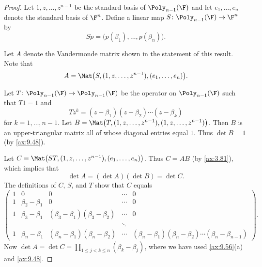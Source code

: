 \begin{proof}
Let $1,z,\dots,z^{n-1}$ be the standard basis of $\Poly_{n-1}(\F)$ and let
$e_1,\dots,e_n$ denote the standard basis of $\F^n$. Define a linear map
$S\colon\Poly_{n-1}(\F)\to\F^n$ by
\[ Sp = \bigl(p(\beta_1),\dots,p(\beta_n)\bigr). \]

Let $A$ denote the Vandermonde matrix shown in the statement of this result.
Note that
\[ A = \Mat\bigl(S,(1,z,\dots,z^{n-1}),(e_1,\dots,e_n)\bigr). \]

Let $T\colon\Poly_{n-1}(\F)\to\Poly_{n-1}(\F)$ be the operator on
$\Poly_{n-1}(\F)$ such that $T1=1$ and
\[ Tz^k = (z-\beta_1)(z-\beta_2)\cdots(z-\beta_k) \]
for $k=1,\dots,n-1$. Let
$B=\Mat\bigl(T,(1,z,\dots,z^{n-1}),(1,z,\dots,z^{n-1})\bigr)$. Then $B$ is an
upper-triangular matrix all of whose diagonal entries equal $1$. Thus
$\det B=1$ (by \ref{ax:9.48}).

Let $C=\Mat\bigl(ST,(1,z,\dots,z^{n-1}),(e_1,\dots,e_n)\bigr)$. Thus $C=AB$
(by \ref{ax:3.81}), which implies that
\[ \det A = (\det A)(\det B) = \det C. \]
The definitions of $C$, $S$, and $T$ show that $C$ equals
\[ \begin{pmatrix}
   1 & 0 & 0 & \cdots & 0\\
   1 & \beta_2-\beta_1 & 0 & \cdots & 0\\
   1 & \beta_3-\beta_1 & (\beta_3-\beta_1)(\beta_3-\beta_2) & \cdots & 0\\
     &  &  & \ddots & \\
   1 & \beta_n-\beta_1 & (\beta_n-\beta_1)(\beta_n-\beta_2) & \cdots
     & (\beta_n-\beta_1)(\beta_n-\beta_2)\cdots(\beta_n-\beta_{n-1})
   \end{pmatrix}. \]
Now $\det A=\det C=\displaystyle\prod_{1\le j<k\le n}(\beta_k-\beta_j)$, where
we have used \ref{ax:9.56}(a) and \ref{ax:9.48}.
\end{proof}

